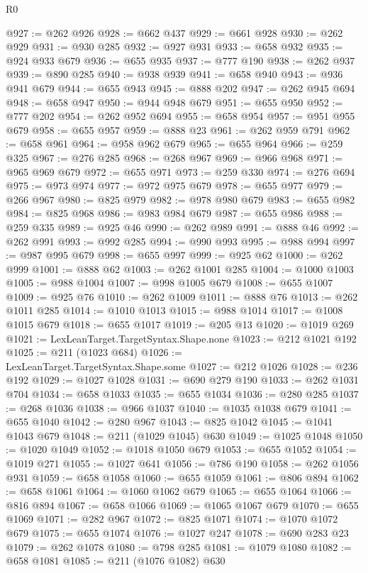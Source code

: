 \begin{lexlean}{R0}
\begin{coremodule}
@927 := @262 @926
@928 := @662 @437
@929 := @661 @928
@930 := @262 @929
@931 := @930 @285
@932 := @927 @931
@933 := @658 @932
@935 := @924 @933 @679
@936 := @655 @935
@937 := @777 @190
@938 := @262 @937
@939 := @890 @285
@940 := @938 @939
@941 := @658 @940
@943 := @936 @941 @679
@944 := @655 @943
@945 := @888 @202
@947 := @262 @945 @694
@948 := @658 @947
@950 := @944 @948 @679
@951 := @655 @950
@952 := @777 @202
@954 := @262 @952 @694
@955 := @658 @954
@957 := @951 @955 @679
@958 := @655 @957
@959 := @888 @23
@961 := @262 @959 @791
@962 := @658 @961
@964 := @958 @962 @679
@965 := @655 @964
@966 := @259 @325
@967 := @276 @285
@968 := @268 @967
@969 := @966 @968
@971 := @965 @969 @679
@972 := @655 @971
@973 := @259 @330
@974 := @276 @694
@975 := @973 @974
@977 := @972 @975 @679
@978 := @655 @977
@979 := @266 @967
@980 := @825 @979
@982 := @978 @980 @679
@983 := @655 @982
@984 := @825 @968
@986 := @983 @984 @679
@987 := @655 @986
@988 := @259 @335
@989 := @925 @46
@990 := @262 @989
@991 := @888 @46
@992 := @262 @991
@993 := @992 @285
@994 := @990 @993
@995 := @988 @994
@997 := @987 @995 @679
@998 := @655 @997
@999 := @925 @62
@1000 := @262 @999
@1001 := @888 @62
@1003 := @262 @1001 @285
@1004 := @1000 @1003
@1005 := @988 @1004
@1007 := @998 @1005 @679
@1008 := @655 @1007
@1009 := @925 @76
@1010 := @262 @1009
@1011 := @888 @76
@1013 := @262 @1011 @285
@1014 := @1010 @1013
@1015 := @988 @1014
@1017 := @1008 @1015 @679
@1018 := @655 @1017
@1019 := @205 @13
@1020 := @1019 @269
@1021 := LexLeanTarget.TargetSyntax.Shape.none
@1023 := @212 @1021 @192
@1025 := @211 (@1023 @684)
@1026 := LexLeanTarget.TargetSyntax.Shape.some
@1027 := @212 @1026
@1028 := @236 @192
@1029 := @1027 @1028
@1031 := @690 @279 @190
@1033 := @262 @1031 @704
@1034 := @658 @1033
@1035 := @655 @1034
@1036 := @280 @285
@1037 := @268 @1036
@1038 := @966 @1037
@1040 := @1035 @1038 @679
@1041 := @655 @1040
@1042 := @280 @967
@1043 := @825 @1042
@1045 := @1041 @1043 @679
@1048 := @211 (@1029 @1045) @630
@1049 := @1025 @1048
@1050 := @1020 @1049
@1052 := @1018 @1050 @679
@1053 := @655 @1052
@1054 := @1019 @271
@1055 := @1027 @641
@1056 := @786 @190
@1058 := @262 @1056 @931
@1059 := @658 @1058
@1060 := @655 @1059
@1061 := @806 @894
@1062 := @658 @1061
@1064 := @1060 @1062 @679
@1065 := @655 @1064
@1066 := @816 @894
@1067 := @658 @1066
@1069 := @1065 @1067 @679
@1070 := @655 @1069
@1071 := @282 @967
@1072 := @825 @1071
@1074 := @1070 @1072 @679
@1075 := @655 @1074
@1076 := @1027 @247
@1078 := @690 @283 @23
@1079 := @262 @1078
@1080 := @798 @285
@1081 := @1079 @1080
@1082 := @658 @1081
@1085 := @211 (@1076 @1082) @630

\end{coremodule}
\end{lexlean}
